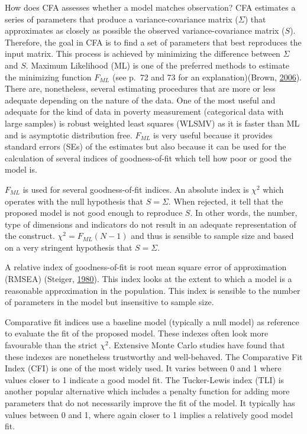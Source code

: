 \documentclass[]{book}
\begin{document}
How does CFA assesses whether a model matches observation? CFA estimates a series of parameters that produce a variance-covariance matrix (\(\Sigma\)) that approximates as closely as possible the observed variance-covariance matrix (\(S\)). Therefore, the goal in CFA is to find a set of parameters that best reproduces the input matrix. This process is achieved by minimizing the difference between \(\Sigma\) and \(S\). Maximum Likelihood (ML) is one of the preferred methods to estimate the minimizing function \(F_{ML}\) (see p.~72 and 73 for an explanation)(Brown, \protect\hyperlink{ref-Brown2006}{2006}). There are, nonetheless, several estimating procedures that are more or less adequate depending on the nature of the data. One of the most useful and adequate for the kind of data in poverty measurement (categorical data with large samples) is robust weighted least squares (WLSMV) as it is faster than ML and is asymptotic distribution free. \(F_{ML}\) is very useful because it provides standard errors (SEs) of the estimates but also because it can be used for the calculation of several indices of goodness-of-fit which tell how poor or good the model is.

\(F_{ML}\) is used for several goodness-of-fit indices. An absolute index is \(\chi^2\) which operates with the null hypothesis that \(S=\Sigma\). When rejected, it tell that the proposed model is not good enough to reproduce \(S\). In other words, the number, type of dimensions and indicators do not result in an adequate representation of the construct. \(\chi^2 = F_{ML}(N-1)\) and thus is sensible to sample size and based on a very stringent hypothesis that \(S=\Sigma\).

A relative index of goodness-of-fit is root mean square error of approximation (RMSEA) (Steiger, \protect\hyperlink{ref-Steiger1980}{1980}). This index looks at the extent to which a model is a reasonable approximation in the population. This index is sensible to the number of parameters in the model but insensitive to sample size.

Comparative fit indices use a baseline model (typically a null model) as reference to evaluate the fit of the proposed model. These indexes often look more favourable than the strict \(\chi^2\). Extensive Monte Carlo studies have found that these indexes are nonetheless trustworthy and well-behaved. The Comparative Fit Index (CFI) is one of the most widely used. It varies between 0 and 1 where values closer to 1 indicate a good model fit. The Tucker-Lewis index (TLI) is another popular alternative which includes a penalty function for adding more parameters that do not necessarily improve the fit of the model. It typically has values between 0 and 1, where again closer to 1 implies a relatively good model fit.
\end{document}
